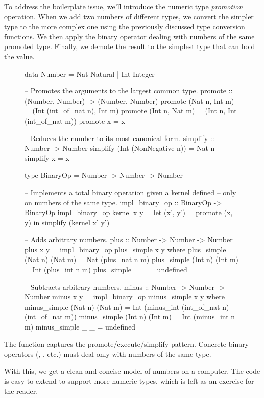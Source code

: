 \documentclass{article}
\begin{document}
To address the boilerplate issue, we'll introduce the numeric type \emph{promotion} operation.
When we add two numbers of different types, we convert the simpler type to the more complex one using the previously discussed type conversion functions.
We then apply the binary operator dealing with numbers of the same promoted type.
Finally, we demote the result to the simplest type that can hold the value.

\begin{figure}
\begin{code}[haskell]
data Number = Nat Natural | Int Integer

-- Promotes the arguments to the largest common type.
promote :: (Number, Number) -> (Number, Number)
promote (Nat n, Int m) = (Int (int_of_nat n), Int m) 
promote (Int n, Nat m) = (Int n, Int (int_of_nat m))
promote x = x

-- Reduces the number to its most canonical form.
simplify :: Number -> Number
simplify (Int (NonNegative n)) = Nat n
simplify x = x

type BinaryOp = Number -> Number -> Number

-- Implements a total binary operation given a kernel defined
-- only on numbers of the same type.
impl_binary_op :: BinaryOp -> BinaryOp
impl_binary_op kernel x y = let (x', y') = promote (x, y)
                            in simplify (kernel x' y')

-- Adds arbitrary numbers.
plus :: Number -> Number -> Number
plus x y = impl_binary_op plus_simple x y
  where plus_simple (Nat n) (Nat m) = Nat (plus_nat n m)
        plus_simple (Int n) (Int m) = Int (plus_int n m)
        plus_simple _ _ = undefined

-- Subtracts arbitrary numbers.
minus :: Number -> Number -> Number
minus x y = impl_binary_op minus_simple x y
  where minus_simple (Nat n) (Nat m) = Int (minus_int (int_of_nat n) (int_of_nat m))
        minus_simple (Int n) (Int m) = Int (minus_int n m)
        minus_simple _ _ = undefined
\end{code}
\end{figure}

The  function captures the promote/execute/simplify pattern.
Concrete binary operators (, , etc.) must deal only with numbers of the same type.

With this, we get a clean and concise model of numbers on a computer.
The code is easy to extend to support more numeric types, which is left as an exercise for the reader.
\end{document}
